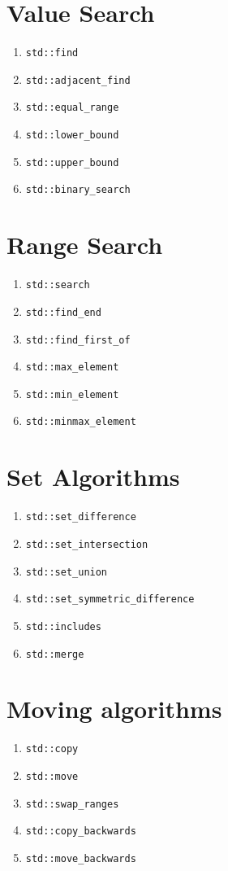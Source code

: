 \documentclass{article}
\begin{document}
\begin{multicols}{3}
\section{Value Search}
\begin{enumerate}[resume]
\setlength\itemsep{0em}
\item \texttt{std::find}
\item \texttt{std::adjacent\_find}
\item \texttt{std::equal\_range}
\item \texttt{std::lower\_bound}
\item \texttt{std::upper\_bound}
\item \texttt{std::binary\_search}
\end{enumerate}

\section{Range Search}
\begin{enumerate}[resume]
\setlength\itemsep{0em}
\item \texttt{std::search}
\item \texttt{std::find\_end}
\item \texttt{std::find\_first\_of}
\item \texttt{std::max\_element}
\item \texttt{std::min\_element}
\item \texttt{std::minmax\_element}
\end{enumerate}

\section{Set Algorithms}
\begin{enumerate}[resume]
\setlength\itemsep{0em}
\item \texttt{std::set\_difference}
\item \texttt{std::set\_intersection}
\item \texttt{std::set\_union}
\item \small{\texttt{std::set\_symmetric\_difference}}
\item \texttt{std::includes}
\item \texttt{std::merge}
\end{enumerate}

\section{Moving algorithms}
\begin{enumerate}[resume]
\setlength\itemsep{0em}
\item \texttt{std::copy}
\item \texttt{std::move}
\item \texttt{std::swap\_ranges}
\item \texttt{std::copy\_backwards}
\item \texttt{std::move\_backwards}
\end{enumerate}


\end{multicols}
\end{document}
